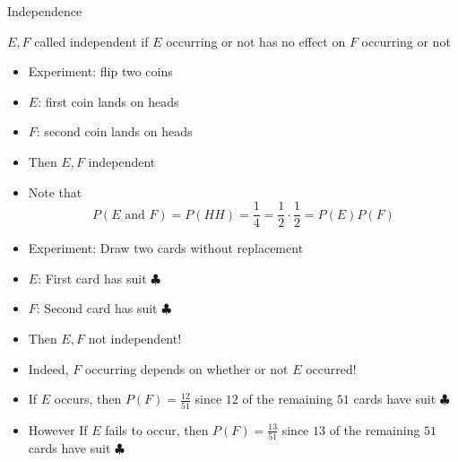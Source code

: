 \documentclass{beamer}
\theoremstyle{definition}
\begin{document}
\begin{frame}{Independence}
\begin{definition}
$E,F$ called \alert{independent} if $E$
occurring or not has no effect on $F$ occurring or not
\end{definition}
\begin{example}
\begin{itemize}
\item Experiment: flip two coins
\item $E$: first coin lands on heads
\item $F$: second coin lands on heads
\item Then $E,F$ independent
\item Note that 
\[P\left(\text{$E$ and $F$}\right)=P\left(HH\right)
=\frac{1}{4}
=\frac{1}{2}\cdot\frac{1}{2}=P\left(E\right)P\left(F\right)\]
\end{itemize}
\end{example}
\end{frame}

\begin{frame}
\begin{example}
\begin{itemize}
\item Experiment: Draw two cards without replacement
\item $E$: First card has suit $\clubsuit$
\item $F$: Second card has suit $\clubsuit$
\item Then $E,F$ \alert{not} independent!
\item Indeed, $F$ occurring depends on whether or not
$E$ occurred!
\item If $E$ occurs, then $P\left(F\right)=\frac{12}{51}$
since $12$ of the remaining $51$ cards have suit $\clubsuit$
\item However If $E$ fails to occur, then $P\left(F\right)=\frac{13}{51}$
since $13$ of the remaining $51$ cards have suit $\clubsuit$
\end{itemize}
\end{example}
\end{frame}
\end{document}
